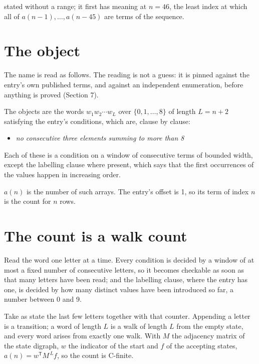\documentclass[11pt]{article}
\theoremstyle{definition}
\begin{document}
stated without a range; it first has meaning at $n = 46$, the least index at which all of $a(n-1),\dots,a(n-45)$ are terms of the sequence.

\section{The object}

The name is read as follows. The reading is not a guess: it is pinned against the entry's own published terms, and against an independent enumeration, before anything is proved (Section 7).

The objects are the words $w_1 w_2 \cdots w_L$ over $\{0,1,\dots,8\}$ of length $L = n + 2$ satisfying the entry's conditions, which are, clause by clause:

\begin{itemize}

\item {\itshape no consecutive three elements summing to more than 8}

\end{itemize}

Each of these is a condition on a window of consecutive terms of bounded width, except the labelling clause where present, which says that the first occurrences of the values happen in increasing order.

$a(n)$ is the number of such arrays. The entry's offset is 1, so its term of index $n$ is the count for $n$ rows.

\section{The count is a walk count}

Read the word one letter at a time. Every condition is decided by a window of at most a fixed number of consecutive letters, so it becomes checkable as soon as that many letters have been read; and the labelling clause, where the entry has one, is decided by how many distinct values have been introduced so far, a number between $0$ and 9.

Take as state the last few letters together with that counter. Appending a letter is a transition; a word of length $L$ is a walk of length $L$ from the empty state, and every word arises from exactly one walk. With $M$ the adjacency matrix of the state digraph, $w$ the indicator of the start and $f$ of the accepting states, $a(n) = w^{\mathsf T}M^{\,L}f$, so the count is C-finite.
\end{document}
